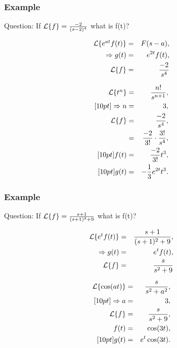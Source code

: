 \begin{frame}
  \frametitle{Example}

  \begin{block}{Question:}
    If $\laplace{f} = \frac{-2}{(s-2)^4}$ what is f(t)?
  \end{block}

  {
    \begin{eqnarray*}
      \laplace{e^{at}f(t)} & = & F(s-a), \\
      \Rightarrow g(t) & = & e^{2t} f(t), \\
      \laplace{f} & = & \frac{-2}{s^4}
    \end{eqnarray*}
  }



\end{frame}


\begin{frame}

  
    \begin{eqnarray*}
      \laplace{t^n} & = & \frac{n!}{s^{n+1}}, \\ [10pt]
      \Rightarrow n & = & 3, \\
      \laplace{f} & = & \frac{-2}{s^{4}}, \\
      & = & \frac{-2}{3!}\cdot\frac{3!}{s^4}, \\ [10pt]
      f(t) & = & \frac{-2}{3!} t^3, \\ [10pt]
      g(t) & = & -\frac{1}{3} e^{2t} t^3.
    \end{eqnarray*}


\end{frame}


\begin{frame}
  \frametitle{Example}

  \begin{block}{Question:}
    If $\laplace{f} = \frac{s+1}{(s+1)^2+9}$ what is f(t)?
  \end{block}

  {
    \begin{eqnarray*}
      \laplace{e^{t}f(t)} & = & \frac{s+1}{(s+1)^2+9}, \\
      \Rightarrow g(t) & = & e^{t} f(t), \\
      \laplace{f} & = & \frac{s}{s^2+9}
    \end{eqnarray*}
  }



\end{frame}


\begin{frame}

    \begin{eqnarray*}
      \laplace{\cos(at)} & = & \frac{s}{s^2+a^2}, \\ [10pt]
      \Rightarrow a & = & 3, \\
      \laplace{f} & = & \frac{s}{s^2+9}, \\
      f(t) & = & \cos(3t), \\ [10pt]
      g(t) & = & e^{t}\cos(3t).
    \end{eqnarray*}

\end{frame}


